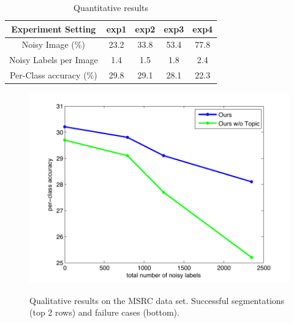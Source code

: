 \begin{table}[!h]
\begin{center}
\begin{tabular}{|c|c|c|c|c|}
\hline
Experiment Setting & exp1 & exp2 & exp3 & exp4 \\
\hline
Noisy Image (\%) & 23.2 & 33.8 & 53.4 & 77.8 \\
\hline
Noisy Labels per Image & 1.4 & 1.5 & 1.8 & 2.4 \\
\hline
Per-Class accuracy (\%) & 29.8 & 29.1 & 28.1 & 22.3 \\
\hline
\end{tabular}
\end{center}
\caption{Quantitative results  }
\label{tab:ExpNoise}
\end{table}


\begin{figure}[h]
\begin{center}
    \includegraphics[width=1\linewidth]{fig_noisylabel.pdf}
\end{center}
    \caption{}
\label{fig:noisylabel}
\end{figure}


\begin{figure}
\begin{center}
\fbox{\rule{0pt}{2in} \rule{.9\linewidth}{0pt}}
\end{center}
   \caption{Qualitative results on the MSRC data set. Successful segmentations (top 2 rows) and failure cases (bottom).}
\label{fig:MSRC}
\end{figure}

